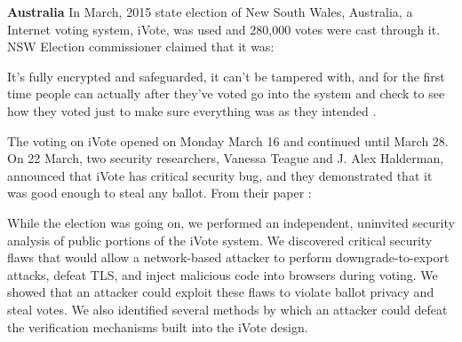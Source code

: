   
%  

 \textbf{Australia}
  In March, 2015 state election 
  of New South Wales, Australia, a Internet voting system, iVote,    
  was used and 280,000 votes were cast through it. NSW Election 
  commissioner claimed that it was:
  
  \begin{displayquote} 
  It's fully encrypted and safeguarded, it can't be tampered with, 
 and for the first time people can actually after they've voted 
 go into the system and check to see how they voted just to make 
 sure everything was as they intended \citep{NSWelection}.
 \end{displayquote}
 

  \noindent
  The voting on iVote 
  opened on Monday March 16 and continued until March 28. On 22 March,
  two security researchers, Vanessa Teague and J. Alex Halderman, 
  announced that iVote has critical security bug, and they demonstrated 
  that it was good enough to steal any ballot. From their paper
  \citep{10.1007/978-3-319-22270-7_3}:
  
  \begin{displayquote}
  
  
   While the election was going on, we performed an independent,
   uninvited security analysis of public portions of the iVote 
   system. We discovered critical security flaws that would allow
   a network-based attacker to perform downgrade-to-export 
   attacks, defeat TLS, and inject malicious code 
   into browsers during voting. We showed that an attacker could
   exploit these flaws to violate ballot privacy and steal votes. 
   We also identified several methods by which an attacker could
   defeat the verification mechanisms built into the iVote design.
   
   \end{displayquote}
  
